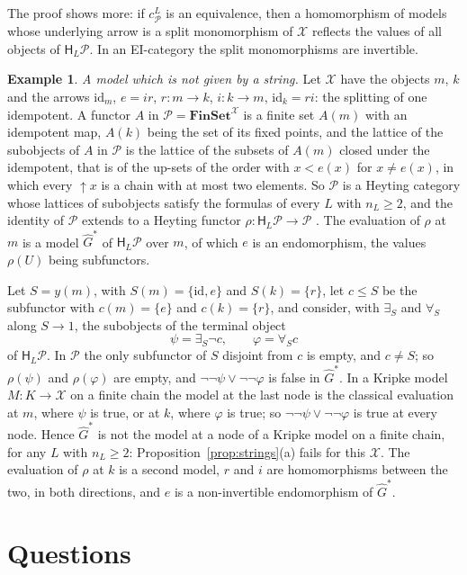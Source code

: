 \documentclass[11pt]{amsart}
\theoremstyle{definition}
\newtheorem{ex}[thm]{Example}
\newcommand{\Fin}{\mathbf{FinSet}}
\newcommand{\HH}{\mathsf H}
\newcommand{\cX}{\mathcal X}
\newcommand{\cP}{\mathcal P}
\newcommand{\id}{\mathrm{id}}
\begin{document}
The proof shows more: if $c^L_\cP$ is an equivalence, then a
homomorphism of models whose underlying arrow is a split monomorphism
of $\cX$ reflects the values of all objects of $\HH_L\cP$. In an
EI-category the split monomorphisms are invertible.

\begin{ex}\label{ex:cluster}
\emph{A model which is not given by a string.} Let $\cX$ have the
objects $m$, $k$ and the arrows $\id_m$, $e=ir$, $r\colon m\to k$,
$i\colon k\to m$, $\id_k=ri$: the splitting of one idempotent. A
functor $A$ in $\cP=\Fin^{\cX}$ is a finite set $A(m)$ with an
idempotent map, $A(k)$ being the set of its fixed points, and the
lattice of the subobjects of $A$ in $\cP$ is the lattice of the
subsets of $A(m)$ closed under the idempotent, that is of the up-sets
of the order with $x<e(x)$ for $x\ne e(x)$, in which every
$\uparrow\!x$ is a chain with at most two elements. So $\cP$ is a
Heyting category whose lattices of subobjects satisfy the formulas of
every $L$ with $n_L\ge2$, and the identity of $\cP$ extends to a
Heyting functor $\rho\colon\HH_L\cP\to\cP$ \cite[\S2]{Interm}. The
evaluation of $\rho$ at $m$ is a model $\hat G^*$ of $\HH_L\cP$ over
$m$, of which $e$ is an endomorphism, the values $\rho(U)$ being
subfunctors.

Let $S=y(m)$, with $S(m)=\{\id,e\}$ and $S(k)=\{r\}$, let $c\le S$ be
the subfunctor with $c(m)=\{e\}$ and $c(k)=\{r\}$, and consider,
with $\exists_S$ and $\forall_S$ along $S\to1$, the subobjects of the
terminal object
\[
\psi=\exists_S\neg c,\qquad\varphi=\forall_Sc
\]
of $\HH_L\cP$. In $\cP$ the only subfunctor of $S$ disjoint from $c$ is
empty, and $c\ne S$; so $\rho(\psi)$ and $\rho(\varphi)$ are empty,
and $\neg\neg\psi\vee\neg\neg\varphi$ is false in $\hat G^*$. In a
Kripke model $M\colon K\to\cX$ on a finite chain the model at the
last node is the classical evaluation at $m$, where $\psi$ is true,
or at $k$, where $\varphi$ is true; so $\neg\neg\psi\vee\neg\neg
\varphi$ is true at every node. Hence $\hat G^*$ is not the model at
a node of a Kripke model on a finite chain, for any $L$ with
$n_L\ge2$: Proposition~\ref{prop:strings}(a) fails for this $\cX$. The evaluation of $\rho$ at $k$ is a second model, $r$ and $i$ are
homomorphisms between the two, in both directions, and $e$ is a
non-invertible endomorphism of $\hat G^*$.
\end{ex}

\section{Questions}
\end{document}
